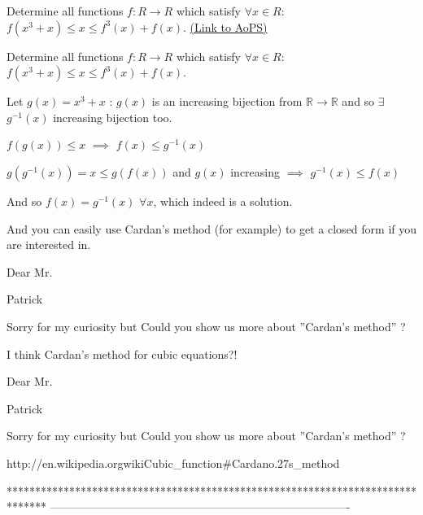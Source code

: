 \begin{problem}
	Determine all functions $ f : R\rightarrow R$ which satisfy  $\forall x\in R $:
$f(x^3 + x)\le x\le f^3(x) + f(x)$.
	\flushright \href{https://artofproblemsolving.com/community/c6h593695}{(Link to AoPS)}
\end{problem}



\begin{solution}
	\begin{tcolorbox}Determine all functions $ f : R\rightarrow R$ which satisfy  $\forall x\in R $:
$f(x^3 + x)\le x\le f^3(x) + f(x)$.\end{tcolorbox}
Let $g(x)=x^3+x$ : $g(x)$ is an increasing bijection from $\mathbb R\to\mathbb R$ and so $\exists$ $g^{-1}(x)$ increasing bijection too.

$f(g(x))\le x$ $\implies$ $f(x)\le g^{-1}(x)$

$g(g^{-1}(x))=x\le g(f(x))$ and $g(x)$ increasing $\implies$ $g^{-1}(x)\le f(x)$

And so $\boxed{f(x)=g^{-1}(x)}$ $\forall x$, which indeed is a solution.

And you can easily use Cardan's method (for example) to get a closed form if you are interested in.
\end{solution}



\begin{solution}
	Dear Mr.\begin{bolded}Patrick\end{bolded}
Sorry for my curiosity but  Could you show us more about ''Cardan's method'' ?
\end{solution}



\begin{solution}
	I think Cardan's method for cubic equations?!
\end{solution}



\begin{solution}
	\begin{tcolorbox}Dear Mr.\begin{bolded}Patrick\end{bolded}
Sorry for my curiosity but  Could you show us more about ''Cardan's method'' ?\end{tcolorbox}
http://en.wikipedia.org\/wiki\/Cubic_function#Cardano.27s_method
\end{solution}
*******************************************************************************
-------------------------------------------------------------------------------

